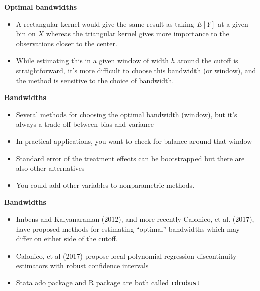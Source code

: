 \documentclass[notes=show]{beamer}
\begin{document}
\begin{frame}[plain]
	\begin{center}
	\textbf{Optimal bandwidths}
	\end{center}
	
	\begin{itemize}
	\item A rectangular kernel would give the same result as taking $E[Y]$ at a given bin on $X$ whereas the triangular kernel gives more importance to the observations closer to the center. 
	\item While estimating this in a given window of width $h$ around the cutoff is straightforward, it's more difficult to choose this bandwidth (or window), and the method is sensitive to the choice of bandwidth. 
	\end{itemize}
	
\end{frame}



\begin{frame}[plain]
\begin{center}
\textbf{Bandwidths}
\end{center}

\begin{itemize}
\item Several methods for choosing the optimal bandwidth (window), but it's always a trade off between bias and variance
\item In practical applications, you want to check for balance around that window
\item Standard error of the treatment effects can be bootstrapped but there are also other alternatives
\item You could add other variables to nonparametric methods.
\end{itemize}

\end{frame}

\begin{frame}[plain]
\begin{center}
\textbf{Bandwidths}
\end{center}

\begin{itemize}
\item Imbens and Kalyanaraman (2012), and more recently Calonico, et al. (2017), have proposed methods for estimating ``optimal'' bandwidths which may differ on either side of the cutoff. 
\item Calonico, et al (2017) propose local-polynomial regression discontinuity estimators with robust confidence intervals
\item Stata ado package and R package are both called \texttt{rdrobust}
\end{itemize}

\end{frame}
\end{document}
